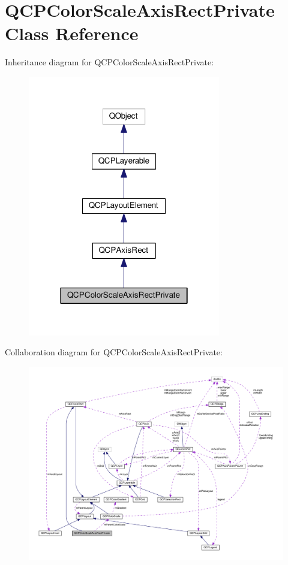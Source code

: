 \hypertarget{classQCPColorScaleAxisRectPrivate}{}\section{Q\+C\+P\+Color\+Scale\+Axis\+Rect\+Private Class Reference}
\label{classQCPColorScaleAxisRectPrivate}


Inheritance diagram for Q\+C\+P\+Color\+Scale\+Axis\+Rect\+Private\+:
\nopagebreak
\begin{figure}[H]
\begin{center}
\leavevmode
\includegraphics[width=238pt]{classQCPColorScaleAxisRectPrivate__inherit__graph}
\end{center}
\end{figure}


Collaboration diagram for Q\+C\+P\+Color\+Scale\+Axis\+Rect\+Private\+:
\nopagebreak
\begin{figure}[H]
\begin{center}
\leavevmode
\includegraphics[width=350pt]{classQCPColorScaleAxisRectPrivate__coll__graph}
\end{center}
\end{figure}
